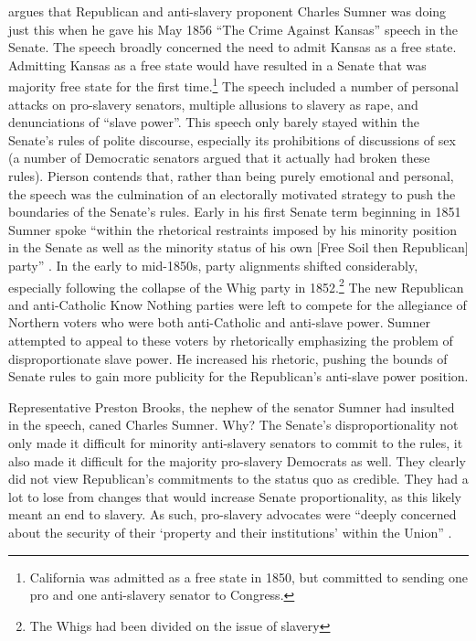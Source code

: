 \documentclass[a4paper]{article}\usepackage[]{graphicx}\usepackage[]{color}
\begin{document}
\cite{Pierson1995} argues that Republican and anti-slavery proponent Charles Sumner was doing just this when he gave his May 1856 ``The Crime Against Kansas'' speech in the Senate. The speech broadly concerned the need to admit Kansas as a free state. Admitting Kansas as a free state would have resulted in a Senate that was majority free state for the first time.\footnote{California was admitted as a free state in 1850, but committed to sending one pro and one anti-slavery senator to Congress.} The speech included a number of personal attacks on pro-slavery senators, multiple allusions to slavery as rape, and denunciations of ``slave power''. This speech only barely stayed within the Senate's rules of polite discourse, especially its prohibitions of discussions of sex (a number of Democratic senators argued that it actually had broken these rules). Pierson contends that, rather than being purely emotional and personal, the speech was the culmination of an electorally motivated strategy to push the boundaries of the Senate's rules. Early in his first Senate term beginning in 1851 Sumner spoke ``within the rhetorical restraints imposed by his minority position in the Senate as well as the minority status of his own [Free Soil then Republican] party'' \cite[534]{Pierson1995}. In the early to mid-1850s, party alignments shifted considerably, especially following the collapse of the Whig party in 1852.\footnote{The Whigs had been divided on the issue of slavery} The new Republican and anti-Catholic Know Nothing parties were left to compete for the allegiance of Northern voters who were both anti-Catholic and anti-slave power. Sumner attempted to appeal to these voters by rhetorically emphasizing the problem of disproportionate slave power. He increased his rhetoric, pushing the bounds of Senate rules to gain more publicity for the Republican's anti-slave power position.

Representative Preston Brooks, the nephew of the senator Sumner had insulted in the speech, caned Charles Sumner. Why? The Senate's disproportionality not only made it difficult for minority anti-slavery senators to commit to the rules, it also made it difficult for the majority pro-slavery Democrats as well. They clearly did not view Republican's commitments to the status quo as credible. They had a lot to lose from changes that would increase Senate proportionality, as this likely meant an end to slavery. As such, pro-slavery advocates were ``deeply concerned about the security of their `property and their institutions' within the Union'' \cite[281]{Mittal2013}.
\end{document}
